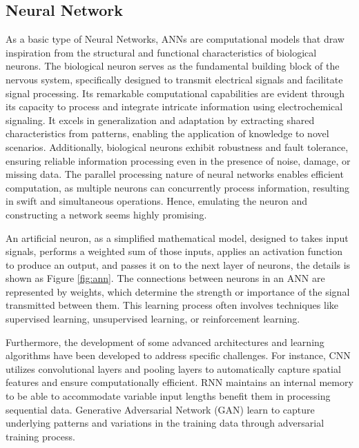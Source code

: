 \subsection{Neural Network}
As a basic type of Neural Networks, \ac{ANN}s are computational models that draw inspiration from the structural and functional characteristics of biological neurons\cite{zhangIntroductionArtificialNeural2000}. The biological neuron serves as the fundamental building block of the nervous system, specifically designed to transmit electrical signals and facilitate signal processing. Its remarkable computational capabilities are evident through its capacity to process and integrate intricate information using electrochemical signaling\cite{zouOverviewArtificialNeural2009}. It excels in generalization and adaptation by extracting shared characteristics from patterns, enabling the application of knowledge to novel scenarios. Additionally, biological neurons exhibit robustness and fault tolerance\cite{chenElectrochemicalMemristorBasedArtificialNeurons}, ensuring reliable information processing even in the presence of noise, damage, or missing data. The parallel processing nature of neural networks enables efficient computation\cite{hopfieldNeuralNetworksPhysical1982}, as multiple neurons can concurrently process information, resulting in swift and simultaneous operations. Hence, emulating the neuron and constructing a network seems highly promising. 

An artificial neuron, as a simplified mathematical model, designed to takes input signals, performs a weighted sum of those inputs, applies an activation function to produce an output, and passes it on to the next layer of neurons, the details is shown as Figure \ref{fig:ann}. The connections between neurons in an ANN are represented by weights, which determine the strength or importance of the signal transmitted between them. This learning process often involves techniques like supervised learning, unsupervised learning, or reinforcement learning. 

Furthermore, the development of some advanced architectures and learning algorithms have been developed to address specific challenges. For instance, \ac{CNN} utilizes convolutional layers and pooling layers to automatically capture spatial features and ensure computationally efficient\cite{albawiUnderstandingConvolutionalNeural2017}. \ac{RNN} maintains an internal memory to be able to accommodate variable input lengths benefit them in processing sequential data\cite{liptonCriticalReviewRecurrent2015}. Generative Adversarial Network (GAN) learn to capture underlying patterns and variations in the training data through adversarial training process\cite{songEnergyConsumptionAuditing2023}. 

